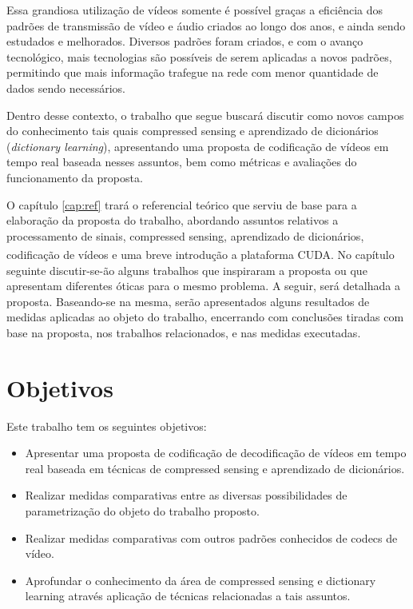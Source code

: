 \documentclass[cic,tc]{iiufrgs}
\newcommand{\reg}{\textsuperscript{\textregistered}}
\begin{document}
Essa grandiosa utilização de vídeos somente é possível graças a eficiência 
dos padrões de transmissão de vídeo e áudio criados ao longo dos anos, 
e ainda sendo estudados e melhorados.
Diversos padrões foram criados, e com o avanço tecnológico, mais tecnologias
são possíveis de serem aplicadas a novos padrões, permitindo que mais informação
trafegue na rede com menor quantidade de dados sendo necessários.

Dentro desse contexto, o trabalho que segue buscará discutir como novos 
campos do conhecimento tais quais compressed sensing e aprendizado de 
dicionários (\emph{dictionary learning}), apresentando uma proposta de 
codificação de vídeos em tempo real baseada nesses assuntos, bem como 
métricas e avaliações do funcionamento da proposta.

O capítulo \autoref{cap:ref} trará o referencial teórico que serviu de base
para a elaboração da proposta do trabalho,
abordando assuntos relativos a processamento de sinais, compressed sensing, 
aprendizado de dicionários, codificação de vídeos e uma breve introdução 
a plataforma CUDA\reg.
No capítulo seguinte discutir-se-ão alguns trabalhos que inspiraram a 
proposta ou que apresentam diferentes óticas para o mesmo problema.
A seguir, será detalhada a proposta. 
Baseando-se na mesma, serão apresentados alguns resultados de medidas 
aplicadas ao objeto do trabalho, encerrando com conclusões tiradas com 
base na proposta, nos trabalhos relacionados, e nas medidas executadas. 

\section{Objetivos}
Este trabalho tem os seguintes objetivos:
\begin{itemize}
    \item Apresentar uma proposta de codificação de decodificação de vídeos
    em tempo real baseada em técnicas de compressed sensing e aprendizado de 
    dicionários.
    \item Realizar medidas comparativas entre as diversas possibilidades 
    de parametrização do objeto do trabalho proposto.
    \item Realizar medidas comparativas com outros padrões conhecidos de 
    codecs de vídeo.
    \item Aprofundar o conhecimento da área de compressed sensing e dictionary 
    learning através aplicação de técnicas relacionadas a tais assuntos.
\end{itemize}
\end{document}
